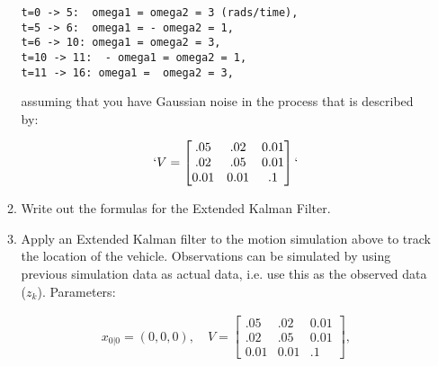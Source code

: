 \begin{enumerate}
\begin{enumerate}
\begin{verbatim}
t=0 -> 5:  omega1 = omega2 = 3 (rads/time),
t=5 -> 6:  omega1 = - omega2 = 1,
t=6 -> 10: omega1 = omega2 = 3,
t=10 -> 11:  - omega1 = omega2 = 1,
t=11 -> 16: omega1 =  omega2 = 3,
\end{verbatim}

    assuming that you have Gaussian noise in the process that is
    described by:

    \[\begin{aligned}
    `V = \begin{bmatrix}.05 &  .02 & 0.01\\.02& .05& 0.01\\ 0.01& 0.01& .1\end{bmatrix}`
    \end{aligned}\]
  \item
    Write out the formulas for the Extended Kalman Filter.
  \item
    Apply an Extended Kalman filter to the motion simulation above to
    track the location of the vehicle. Observations can be simulated by
    using previous simulation data as actual data, i.e. use this as the
    observed data (\(z_k\)). Parameters:

    \[\begin{aligned}
    x_{0|0} = (0,0,0), \quad V = \begin{bmatrix}.05 &  .02 & 0.01\\.02& .05& 0.01\\ 0.01& 0.01& .1\end{bmatrix},
    \end{aligned}\]


\end{enumerate}
\end{enumerate}
